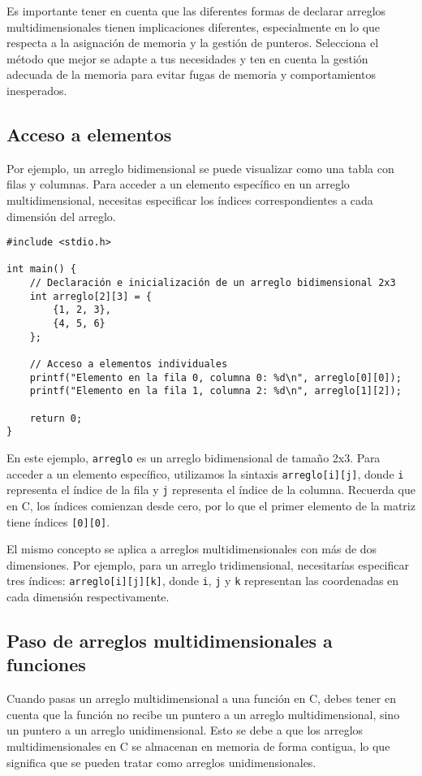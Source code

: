 Es importante tener en cuenta que las diferentes formas de declarar arreglos multidimensionales tienen implicaciones diferentes, especialmente en lo que respecta a la asignación de memoria y la gestión de punteros. Selecciona el método que mejor se adapte a tus necesidades y ten en cuenta la gestión adecuada de la memoria para evitar fugas de memoria y comportamientos inesperados.

\subsection{Acceso a elementos}
Por ejemplo, un arreglo bidimensional se puede visualizar como una tabla con filas y columnas. Para acceder a un elemento específico en un arreglo multidimensional, necesitas especificar los índices correspondientes a cada dimensión del arreglo.

\begin{verbatim}
#include <stdio.h>

int main() {
    // Declaración e inicialización de un arreglo bidimensional 2x3
    int arreglo[2][3] = {
        {1, 2, 3},
        {4, 5, 6}
    };

    // Acceso a elementos individuales
    printf("Elemento en la fila 0, columna 0: %d\n", arreglo[0][0]);
    printf("Elemento en la fila 1, columna 2: %d\n", arreglo[1][2]);

    return 0;
}
\end{verbatim}

En este ejemplo, \texttt{arreglo} es un arreglo bidimensional de tamaño 2x3. Para acceder a un elemento específico, utilizamos la sintaxis \texttt{arreglo[i][j]}, donde \texttt{i} representa el índice de la fila y \texttt{j} representa el índice de la columna. Recuerda que en C, los índices comienzan desde cero, por lo que el primer elemento de la matriz tiene índices \texttt{[0][0]}.

El mismo concepto se aplica a arreglos multidimensionales con más de dos dimensiones. Por ejemplo, para un arreglo tridimensional, necesitarías especificar tres índices: \texttt{arreglo[i][j][k]}, donde \texttt{i}, \texttt{j} y \texttt{k} representan las coordenadas en cada dimensión respectivamente.

\subsection{Paso de arreglos multidimensionales a funciones}
Cuando pasas un arreglo multidimensional a una función en C, debes tener en cuenta que la función no recibe un puntero a un arreglo multidimensional, sino un puntero a un arreglo unidimensional. Esto se debe a que los arreglos multidimensionales en C se almacenan en memoria de forma contigua, lo que significa que se pueden tratar como arreglos unidimensionales.

